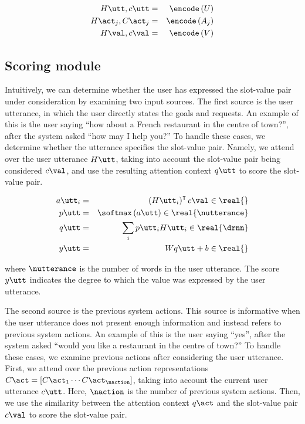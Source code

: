 \documentclass[11pt,a4paper]{article}
\begin{document}
\begin{eqnarray}
H\utt, c\utt &=& \encode \left( U \right) \\
H\act_j, C\act_j &=& \encode \left( A_j \right) \\
H\val, c\val &=& \encode \left( V \right) 
\end{eqnarray}


\subsection{Scoring module}

Intuitively, we can determine whether the user has expressed the slot-value pair under consideration by examining two input sources.
The first source is the user utterance, in which the user directly states the goals and requests.
An example of this is the user saying ``how about a French restaurant in the centre of town?'', after the system asked ``how may I help you?''
To handle these cases, we determine whether the utterance specifies the slot-value pair.
Namely, we attend over the user utterance $H\utt$, taking into account the slot-value pair being considered $c\val$, and use the resulting attention context $q\utt$ to score the slot-value pair.

\begin{eqnarray}
a\utt_i &=& \left( H\utt_i \right)^\intercal c\val \in \real{}\\
p\utt &=& \softmax \left( a\utt \right) \in \real{\nutterance}\\
q\utt &=& \sum_i p\utt_i H\utt_i \in \real{\drnn} \\
\label{eq:uttscore}
y\utt &=& W q\utt + b \in \real{}
\end{eqnarray}

where $\nutterance$ is the number of words in the user utterance.
The score $y\utt$ indicates the degree to which the value was expressed by the user utterance.

The second source is the previous system actions.
This source is informative when the user utterance does not present enough information and instead refers to previous system actions.
An example of this is the user saying ``yes'', after the system asked ``would you like a restaurant in the centre of town?''
To handle these cases, we examine previous actions after considering the user utterance.
First, we attend over the previous action representations $C\act = [C\act_1 \cdots C\act_\naction]$, taking into account the current user utterance $c\utt$.
Here, $\naction$ is the number of previous system actions.
Then, we use the similarity between the attention context $q\act$ and the slot-value pair $c\val$ to score the slot-value pair.
\end{document}

